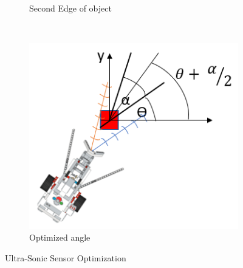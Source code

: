 \begin{figure}[!ht]
\begin{subfigure}[b]{0.3\textwidth}
		\caption{Second Edge of object}
		\label{fig:op2}
	\end{subfigure}
	~
	\begin{subfigure}[b]{0.3\textwidth}
	\centering
	\includegraphics[width=\textwidth]{Graphics/opt3}
	\caption{Optimized angle}
	\label{fig:opt3}
	\end{subfigure}
	\caption{Ultra-Sonic Sensor Optimization}
	\label{fig:optimization}
	\vspace{-4mm}
\end{figure}


